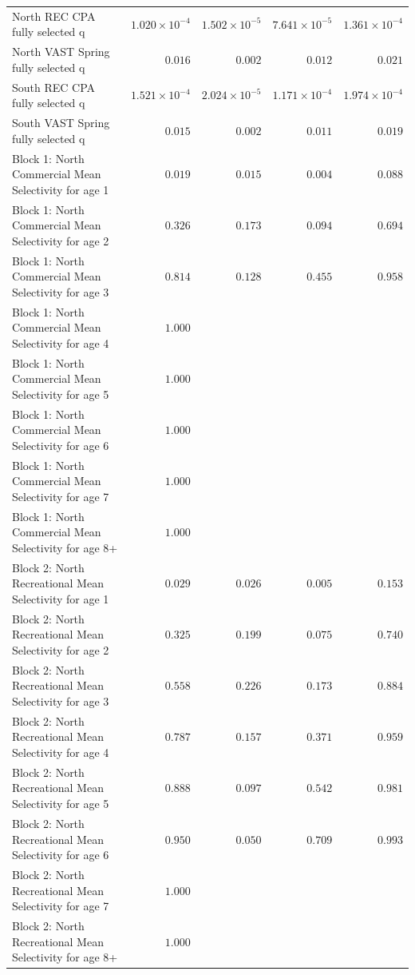 \documentclass[
]{article}
\begin{document}
\begin{landscape}
\begin{longtable}[t]{lrrrr}
\addlinespace
North REC CPA fully selected q & $1.020\times 10^{-4}$ & $1.502\times 10^{-5}$ & $7.641\times 10^{-5}$ & $1.361\times 10^{-4}$\\
North VAST Spring fully selected q & $0.016$ & $0.002$ & $0.012$ & $0.021$\\
South REC CPA fully selected q & $1.521\times 10^{-4}$ & $2.024\times 10^{-5}$ & $1.171\times 10^{-4}$ & $1.974\times 10^{-4}$\\
South VAST Spring fully selected q & $0.015$ & $0.002$ & $0.011$ & $0.019$\\
Block 1: North Commercial Mean Selectivity for age 1 & $0.019$ & $0.015$ & $0.004$ & $0.088$\\
\addlinespace
Block 1: North Commercial Mean Selectivity for age 2 & $0.326$ & $0.173$ & $0.094$ & $0.694$\\
Block 1: North Commercial Mean Selectivity for age 3 & $0.814$ & $0.128$ & $0.455$ & $0.958$\\
Block 1: North Commercial Mean Selectivity for age 4 & $1.000$ &  &  & \\
Block 1: North Commercial Mean Selectivity for age 5 & $1.000$ &  &  & \\
Block 1: North Commercial Mean Selectivity for age 6 & $1.000$ &  &  & \\
\addlinespace
Block 1: North Commercial Mean Selectivity for age 7 & $1.000$ &  &  & \\
Block 1: North Commercial Mean Selectivity for age 8+ & $1.000$ &  &  & \\
Block 2: North Recreational Mean Selectivity for age 1 & $0.029$ & $0.026$ & $0.005$ & $0.153$\\
Block 2: North Recreational Mean Selectivity for age 2 & $0.325$ & $0.199$ & $0.075$ & $0.740$\\
Block 2: North Recreational Mean Selectivity for age 3 & $0.558$ & $0.226$ & $0.173$ & $0.884$\\
\addlinespace
Block 2: North Recreational Mean Selectivity for age 4 & $0.787$ & $0.157$ & $0.371$ & $0.959$\\
Block 2: North Recreational Mean Selectivity for age 5 & $0.888$ & $0.097$ & $0.542$ & $0.981$\\
Block 2: North Recreational Mean Selectivity for age 6 & $0.950$ & $0.050$ & $0.709$ & $0.993$\\
Block 2: North Recreational Mean Selectivity for age 7 & $1.000$ &  &  & \\
Block 2: North Recreational Mean Selectivity for age 8+ & $1.000$ &  &  & \\

\end{longtable}
\end{landscape}
\end{document}
